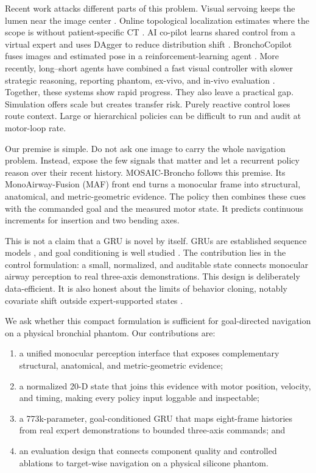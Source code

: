 \documentclass[letterpaper,10pt,conference]{ieeeconf}
\begin{document}
Recent work attacks different parts of this problem. Visual servoing keeps the
lumen near the image center \cite{lazo2022visualservo}. Online topological
localization estimates where the scope is without patient-specific CT
\cite{tomasini2025topological}. AI co-pilot learns shared control from a virtual
expert and uses DAgger to reduce distribution shift
\cite{zhang2024aicopilot}. BronchoCopilot fuses images and estimated pose in a
reinforcement-learning agent \cite{zhao2024bronchocopilot}. More recently,
long--short agents have combined a fast visual controller with slower strategic
reasoning, reporting phantom, ex-vivo, and in-vivo evaluation
\cite{wu2026longshort}. Together, these systems show rapid progress. They also
leave a practical gap. Simulation offers scale but creates transfer risk.
Purely reactive control loses route context. Large or hierarchical policies can
be difficult to run and audit at motor-loop rate.

Our premise is simple. Do not ask one image to carry the whole navigation
problem. Instead, expose the few signals that matter and let a recurrent policy
reason over their recent history. MOSAIC-Broncho follows this premise. Its
MonoAirway-Fusion (MAF) front end turns a monocular frame into structural,
anatomical, and metric-geometric evidence. The policy then combines these cues
with the commanded goal and the measured motor state. It predicts continuous
increments for insertion and two bending axes.

This is not a claim that a GRU is novel by itself. GRUs are established sequence
models \cite{cho2014gru}, and goal conditioning is well studied
\cite{codevilla2018conditional}. The contribution lies in the control
formulation: a small, normalized, and auditable state connects monocular airway
perception to real three-axis demonstrations. This design is deliberately
data-efficient. It is also honest about the limits of behavior cloning, notably
covariate shift outside expert-supported states
\cite{argall2009survey,osa2018imitation,ross2011dagger}.

We ask whether this compact formulation is sufficient for goal-directed
navigation on a physical bronchial phantom. Our contributions are:
\begin{enumerate}
  \item a unified monocular perception interface that exposes complementary
  structural, anatomical, and metric-geometric evidence;
  \item a normalized 20-D state that joins this evidence with motor position,
  velocity, and timing, making every policy input loggable and inspectable;
  \item a 773k-parameter, goal-conditioned GRU that maps eight-frame histories
  from real expert demonstrations to bounded three-axis commands; and
  \item an evaluation design that connects component quality and controlled
  ablations to target-wise navigation on a physical silicone phantom.
\end{enumerate}
\end{document}
